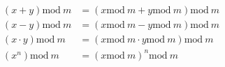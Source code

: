 
\begin{align*}
    (x+y) \text{mod}\ m & = (x \text{mod}\ m + y \text{mod}\ m) \text{mod}\ m \\
    (x-y) \text{mod}\ m & = (x \text{mod}\ m - y \text{mod}\ m) \text{mod}\ m \\
    (x\cdot y) \text{mod}\ m & = (x \text{mod}\ m \cdot y \text{mod}\ m) \text{mod}\ m \\
    (x^n) \text{mod}\ m & = (x \text{mod}\ m)^n  \text{mod}\ m
\end{align*}
